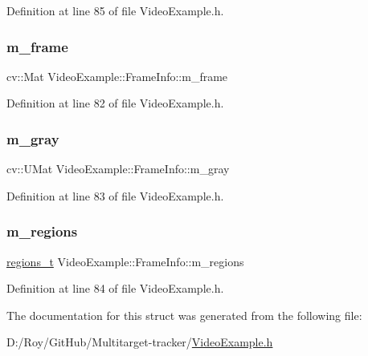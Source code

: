 Definition at line 85 of file Video\+Example.\+h.

\mbox{\label{struct_video_example_1_1_frame_info_ace63373cca952f2c7f281b18220f9f8c}} 
\subsubsection{\texorpdfstring{m\+\_\+frame}{m\_frame}}
{\footnotesize\ttfamily cv\+::\+Mat Video\+Example\+::\+Frame\+Info\+::m\+\_\+frame}



Definition at line 82 of file Video\+Example.\+h.

\mbox{\label{struct_video_example_1_1_frame_info_ad7354c359e618ccc2febcfd50e6edb15}} 
\subsubsection{\texorpdfstring{m\+\_\+gray}{m\_gray}}
{\footnotesize\ttfamily cv\+::\+U\+Mat Video\+Example\+::\+Frame\+Info\+::m\+\_\+gray}



Definition at line 83 of file Video\+Example.\+h.

\mbox{\label{struct_video_example_1_1_frame_info_aa4f6d562d893f578ad71144b2145fd50}} 
\subsubsection{\texorpdfstring{m\+\_\+regions}{m\_regions}}
{\footnotesize\ttfamily \mbox{\hyperlink{defines_8h_a01db0de56a20f4342820a093c5154536}{regions\+\_\+t}} Video\+Example\+::\+Frame\+Info\+::m\+\_\+regions}



Definition at line 84 of file Video\+Example.\+h.



The documentation for this struct was generated from the following file\+:\begin{DoxyCompactItemize}
\item 
D\+:/\+Roy/\+Git\+Hub/\+Multitarget-\/tracker/\mbox{\hyperlink{_video_example_8h}{Video\+Example.\+h}}\end{DoxyCompactItemize}

